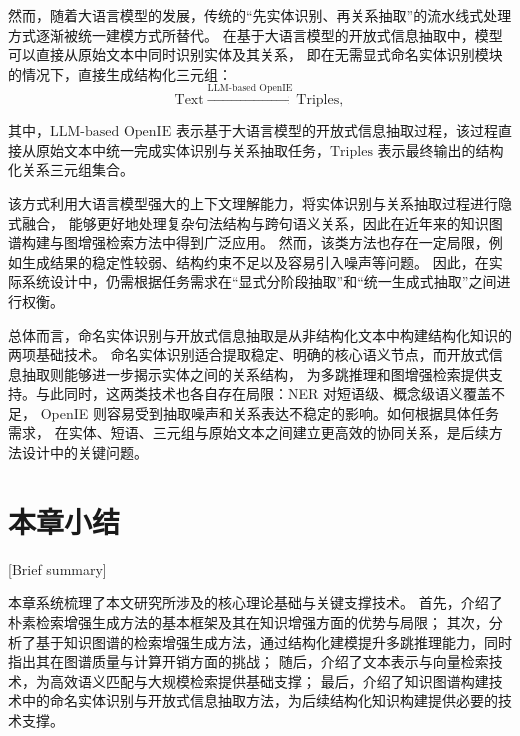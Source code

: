 然而，随着大语言模型的发展，传统的“先实体识别、再关系抽取”的流水线式处理方式逐渐被统一建模方式所替代。
在基于大语言模型的开放式信息抽取中，模型可以直接从原始文本中同时识别实体及其关系，
即在无需显式命名实体识别模块的情况下，直接生成结构化三元组：
\begin{equation}
\text{Text} \xrightarrow{\text{LLM-based OpenIE}} \text{Triples},
\end{equation}

\noindent 其中，$\text{LLM-based OpenIE}$ 表示基于大语言模型的开放式信息抽取过程，该过程直接从原始文本中统一完成实体识别与关系抽取任务，$\text{Triples}$ 表示最终输出的结构化关系三元组集合。

该方式利用大语言模型强大的上下文理解能力，将实体识别与关系抽取过程进行隐式融合，
能够更好地处理复杂句法结构与跨句语义关系，因此在近年来的知识图谱构建与图增强检索方法中得到广泛应用。
然而，该类方法也存在一定局限，例如生成结果的稳定性较弱、结构约束不足以及容易引入噪声等问题。
因此，在实际系统设计中，仍需根据任务需求在“显式分阶段抽取”和“统一生成式抽取”之间进行权衡。

总体而言，命名实体识别与开放式信息抽取是从非结构化文本中构建结构化知识的两项基础技术。
命名实体识别适合提取稳定、明确的核心语义节点，而开放式信息抽取则能够进一步揭示实体之间的关系结构，
为多跳推理和图增强检索提供支持。与此同时，这两类技术也各自存在局限：NER 对短语级、概念级语义覆盖不足，
OpenIE 则容易受到抽取噪声和关系表达不稳定的影响。如何根据具体任务需求，
在实体、短语、三元组与原始文本之间建立更高效的协同关系，是后续方法设计中的关键问题。

\section{本章小结}[Brief summary]

本章系统梳理了本文研究所涉及的核心理论基础与关键支撑技术。
首先，介绍了朴素检索增强生成方法的基本框架及其在知识增强方面的优势与局限；
其次，分析了基于知识图谱的检索增强生成方法，通过结构化建模提升多跳推理能力，同时指出其在图谱质量与计算开销方面的挑战；
随后，介绍了文本表示与向量检索技术，为高效语义匹配与大规模检索提供基础支撑；
最后，介绍了知识图谱构建技术中的命名实体识别与开放式信息抽取方法，为后续结构化知识构建提供必要的技术支撑。